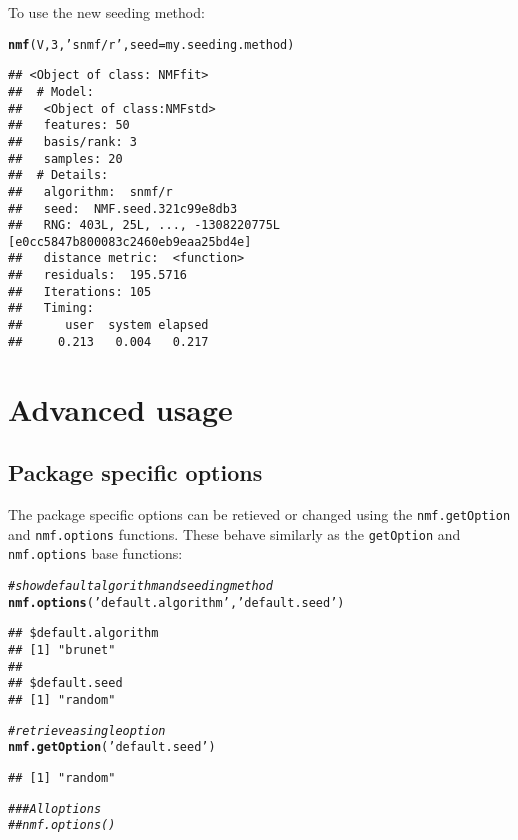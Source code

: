\documentclass[a4paper]{article}\usepackage[]{graphicx}\usepackage[]{color}
\makeatletter
\newcommand{\hlnum}[1]{\textcolor[rgb]{0.686,0.059,0.569}{#1}}%
\newcommand{\hlstr}[1]{\textcolor[rgb]{0.192,0.494,0.8}{#1}}%
\newcommand{\hlcom}[1]{\textcolor[rgb]{0.678,0.584,0.686}{\textit{#1}}}%
\newcommand{\hlstd}[1]{\textcolor[rgb]{0.345,0.345,0.345}{#1}}%
\newcommand{\hlkwc}[1]{\textcolor[rgb]{0.333,0.667,0.333}{#1}}%
\newcommand{\hlkwd}[1]{\textcolor[rgb]{0.737,0.353,0.396}{\textbf{#1}}}%
\newenvironment{kframe}{%
 \def\at@end@of@kframe{}%
 \ifinner\ifhmode%
  \def\at@end@of@kframe{\end{minipage}}%
  \begin{minipage}{\columnwidth}%
 \fi\fi%
 \def\FrameCommand##1{\hskip\@totalleftmargin \hskip-\fboxsep
 \colorbox{shadecolor}{##1}\hskip-\fboxsep
     \hskip-\linewidth \hskip-\@totalleftmargin \hskip\columnwidth}%
 \MakeFramed {\advance\hsize-\width
   \@totalleftmargin\z@ \linewidth\hsize
   \@setminipage}}%
 {\par\unskip\endMakeFramed%
 \at@end@of@kframe}
\newenvironment{knitrout}{}{} %
\let\code=\texttt
\makeatother
\begin{document}
To use the new seeding method:
\begin{knitrout}
\color{fgcolor}\begin{kframe}
\begin{alltt}
\hlkwd{nmf}\hlstd{(V,} \hlnum{3}\hlstd{,} \hlstr{'snmf/r'}\hlstd{,} \hlkwc{seed}\hlstd{=my.seeding.method)}
\end{alltt}
\begin{verbatim}
## <Object of class: NMFfit>
##  # Model:
##   <Object of class:NMFstd>
##   features: 50 
##   basis/rank: 3 
##   samples: 20 
##  # Details:
##   algorithm:  snmf/r 
##   seed:  NMF.seed.321c99e8db3 
##   RNG: 403L, 25L, ..., -1308220775L [e0cc5847b800083c2460eb9eaa25bd4e]
##   distance metric:  <function> 
##   residuals:  195.5716 
##   Iterations: 105 
##   Timing:
##      user  system elapsed 
##     0.213   0.004   0.217
\end{verbatim}
\end{kframe}
\end{knitrout}

\section{Advanced usage}

\subsection{Package specific options}
The package specific options can be retieved or changed using the \code{nmf.getOption} and \code{nmf.options} functions. 
These behave similarly as the \code{getOption} and \code{nmf.options} base functions:

\begin{knitrout}
\color{fgcolor}\begin{kframe}
\begin{alltt}
\hlcom{#show default algorithm and seeding method}
\hlkwd{nmf.options}\hlstd{(}\hlstr{'default.algorithm'}\hlstd{,} \hlstr{'default.seed'}\hlstd{)}
\end{alltt}
\begin{verbatim}
## $default.algorithm
## [1] "brunet"
## 
## $default.seed
## [1] "random"
\end{verbatim}
\begin{alltt}
\hlcom{# retrieve a single option}
\hlkwd{nmf.getOption}\hlstd{(}\hlstr{'default.seed'}\hlstd{)}
\end{alltt}
\begin{verbatim}
## [1] "random"
\end{verbatim}
\begin{alltt}
\hlcom{## # All options}
\hlcom{## nmf.options()}
\end{alltt}
\end{kframe}
\end{knitrout}
\end{document}

